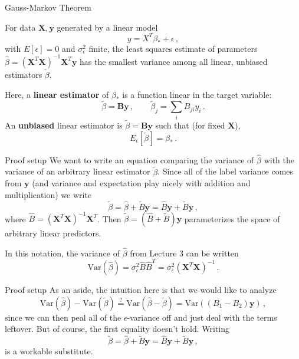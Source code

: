 \documentclass[10pt, table, dvipsnames,xcdraw,handout]{beamer}
\newcommand{\bfX}{\ensuremath{\mathbf{X}}}
\newcommand{\bfy}{\ensuremath{\mathbf{y}}}
\begin{document}
\begin{frame}[fragile]{Gauss-Markov Theorem} 

\begin{theorem}
For data $\bfX,\bfy$ generated by a linear model 
$$
y = X^T\beta_* + \epsilon\,,
$$
with $E[\epsilon] = 0$ and $\sigma_\epsilon^2$ finite, the least squares estimate of parameters $\hat\beta = (\bfX^T\bfX)^{-1}\bfX^T\bfy$ has the smallest variance among all linear, unbiased estimators $\widetilde{\beta}$. \pause
\end{theorem}

Here, a \textbf{linear estimator} of $\beta_*$ is a function linear in the target variable:
$$
\widetilde{\beta} = \mathbf{B}\bfy\,,\hspace{2em} \widetilde{\beta}_j = \sum_i B_{ji}y_i\,.
$$\pause
An \textbf{unbiased} linear estimator is $\widetilde{\beta} = \mathbf{B}\bfy$ such that (for fixed $\bfX$), 
$$
E_\epsilon[\widetilde{\beta}] = \beta_*\,.
$$
\end{frame}




\begin{frame}[fragile]{Proof setup} 
We want to write an equation comparing the variance of $\hat\beta$ with the variance of an arbitrary linear estimator $\widetilde\beta$. \pause Since all of the label variance comes from $\bfy$ (and variance and expectation play nicely with addition and multiplication) we write 
$$
\widetilde{\beta} = \hat\beta + \widetilde{B}\bfy = \hat B\bfy + \widetilde{B}\bfy \,,
$$
where $\hat B = (\bfX^T\bfX)^{-1}\bfX^T$. \pause Then $\widetilde{\beta} = (\hat B + \widetilde{B})\bfy$ parameterizes the space of arbitrary linear predictors. \pause

In this notation, the variance of $\hat \beta$ from Lecture 3 can be written 
$$
\text{Var}(\hat\beta) = \sigma^2_\epsilon \hat B\hat B^T = \sigma^2_\epsilon(\bfX^T\bfX)^{-1}\,.
$$
\end{frame}


\begin{frame}[fragile]{Proof setup} 
As an aside, the intuition here is that we would like to analyze
$$
\text{Var}(\hat\beta) - \text{Var}(\tilde\beta) \overset{?}{=}  \text{Var}(\hat\beta - \tilde\beta)  = \text{Var}((B_1 - B_2)\bfy)\,,
$$
since we can then peal all of the $\epsilon$-variance off and just deal with the terms leftover. \pause But of course, the first equality doesn't hold.  Writing 
$$
\widetilde{\beta} = \hat\beta + \widetilde{B}\bfy = \hat B\bfy + \widetilde{B}\bfy \,,
$$
is a workable substitute. 
\end{frame}
\end{document}
